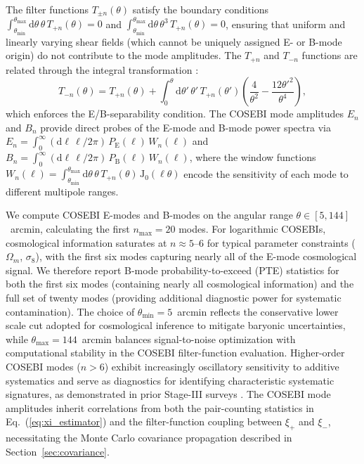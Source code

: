 \documentclass{aa}
\begin{document}
The filter functions $T_{\pm n}(\theta)$ satisfy the boundary conditions $\int_{\theta_{\mathrm{min}}}^{\theta_{\mathrm{max}}} \mathrm{d}\theta \, \theta \, T_{+n}(\theta) = 0$ and $\int_{\theta_{\mathrm{min}}}^{\theta_{\mathrm{max}}} \mathrm{d}\theta \, \theta^3 \, T_{+n}(\theta) = 0$, ensuring that uniform and linearly varying shear fields (which cannot be uniquely assigned E- or B-mode origin) do not contribute to the mode amplitudes. The $T_{+n}$ and $T_{-n}$ functions are related through the integral transformation \citep{schneider.eifler.krause10}:
\begin{equation}
T_{-n}(\theta) = T_{+n}(\theta) + \int_0^\theta \mathrm{d}\theta' \, \theta' \, T_{+n}(\theta') \left(\frac{4}{\theta^2} - \frac{12\theta'^2}{\theta^4}\right),
\label{eq:Tpm_relation}
\end{equation}
which enforces the E/B-separability condition. The COSEBI mode amplitudes $E_n$ and $B_n$ provide direct probes of the E-mode and B-mode power spectra via $E_n = \int_0^\infty (\mathrm{d}\ell \, \ell / 2\pi) \, P_{\mathrm{E}}(\ell) \, W_n(\ell)$ and $B_n = \int_0^\infty (\mathrm{d}\ell \, \ell / 2\pi) \, P_{\mathrm{B}}(\ell) \, W_n(\ell)$, where the window functions $W_n(\ell) = \int_{\theta_{\mathrm{min}}}^{\theta_{\mathrm{max}}} \mathrm{d}\theta \, \theta \, T_{+n}(\theta) \, \mathrm{J}_0(\ell\theta)$ encode the sensitivity of each mode to different multipole ranges.

We compute COSEBI E-modes and B-modes on the angular range $\theta \in [5, 144]$~arcmin, calculating the first $n_{\mathrm{max}} = 20$ modes. For logarithmic COSEBIs, cosmological information saturates at $n \approx 5$--$6$ for typical parameter constraints ($\Omega_m$, $\sigma_8$), with the first six modes capturing nearly all of the E-mode cosmological signal. We therefore report B-mode probability-to-exceed (PTE) statistics for both the first six modes (containing nearly all cosmological information) and the full set of twenty modes (providing additional diagnostic power for systematic contamination). The choice of $\theta_{\mathrm{min}} = 5$~arcmin reflects the conservative lower scale cut adopted for cosmological inference to mitigate baryonic uncertainties, while $\theta_{\mathrm{max}} = 144$~arcmin balances signal-to-noise optimization with computational stability in the COSEBI filter-function evaluation. Higher-order COSEBI modes ($n > 6$) exhibit increasingly oscillatory sensitivity to additive systematics and serve as diagnostics for identifying characteristic systematic signatures, as demonstrated in prior Stage-III surveys \citep{asgari.etal20}. The COSEBI mode amplitudes inherit correlations from both the pair-counting statistics in Eq.~(\ref{eq:xi_estimator}) and the filter-function coupling between $\xi_+$ and $\xi_-$, necessitating the Monte Carlo covariance propagation described in Section~\ref{sec:covariance}.
\end{document}
